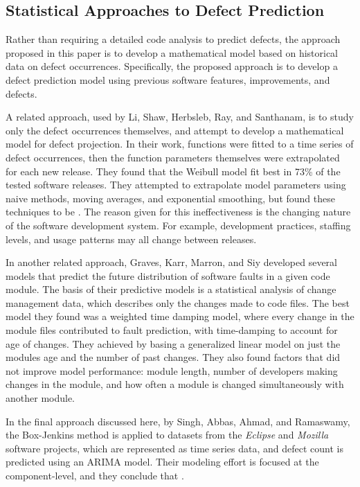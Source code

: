 \documentclass[a4paper]{scrartcl}
\begin{document}
\subsection*{Statistical Approaches to Defect Prediction}
Rather than requiring a detailed code analysis to predict defects, the approach proposed in this paper is to develop a mathematical model based on historical data on defect occurrences. Specifically, the proposed approach is to develop a defect prediction model using previous software features, improvements, and defects.

A related approach, used by Li, Shaw, Herbsleb, Ray, and Santhanam\cite{2004_li_emperical_eval}, is to study only the defect occurrences themselves, and attempt to develop a mathematical model for defect projection. In their work, functions were fitted to a time series of defect occurrences, then the function parameters themselves were extrapolated for each new release. They found that the Weibull model fit best in 73\% of the tested software releases. They attempted to extrapolate model parameters using naive methods, moving averages, and exponential smoothing, but found these techniques to be . The reason given for this ineffectiveness is the changing nature of the software development system. For example, development practices, staffing levels, and usage patterns may all change between releases.

In another related approach, Graves, Karr, Marron, and Siy\cite{2000_graves_predicting} developed several models that predict the future distribution of software faults in a given code module. The basis of their predictive models is a statistical analysis of change management data, which describes only the changes made to code files. The best model they found was a weighted time damping model, where every change in the module files contributed to fault prediction, with time-damping to account for age of changes. They achieved  by basing a generalized linear model on just the modules age and the number of past changes. They also found factors that did not improve model performance: module length, number of developers making changes in the module, and how often a module is changed simultaneously with another module.

In the final approach discussed here, by Singh, Abbas, Ahmad, and Ramaswamy\cite{2010_singh_predicting}, the Box-Jenkins method is applied to datasets from the \textit{Eclipse} and \textit{Mozilla} software projects, which are represented as time series data, and defect count is predicted using an ARIMA model. Their modeling effort is focused at the component-level, and they conclude that .
\end{document}
